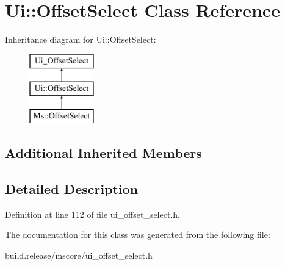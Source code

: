 \hypertarget{class_ui_1_1_offset_select}{}\section{Ui\+:\+:Offset\+Select Class Reference}
\label{class_ui_1_1_offset_select}
Inheritance diagram for Ui\+:\+:Offset\+Select\+:\begin{figure}[H]
\begin{center}
\leavevmode
\includegraphics[height=3.000000cm]{class_ui_1_1_offset_select}
\end{center}
\end{figure}
\subsection*{Additional Inherited Members}


\subsection{Detailed Description}


Definition at line 112 of file ui\+\_\+offset\+\_\+select.\+h.



The documentation for this class was generated from the following file\+:\begin{DoxyCompactItemize}
\item 
build.\+release/mscore/ui\+\_\+offset\+\_\+select.\+h\end{DoxyCompactItemize}
